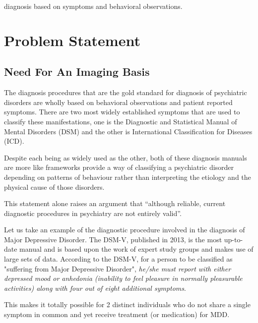 \documentclass{article}
\begin{document}
diagnosis based on symptoms and behavioral observations.

\section{Problem Statement}

\subsection{Need For An Imaging Basis}

The diagnosis procedures that are the gold standard for diagnosis of
psychiatric disorders are wholly based on behavioral observations and
patient reported symptoms. There are two most widely established
symptoms that are used to classify these manifestations, one is the
Diagnostic and Statistical Manual of Mental Disorders (DSM) and the
other is International Classification for Diseases (ICD).

Despite each being as widely used as the other, both of these
diagnosis manuals are more like frameworks provide a way of
classifying a psychiatric disorder depending on patterns of behaviour
rather than interpreting the etiology and the physical cause of those
disorders.

This statement alone raises an argument that ``although reliable,
current diagnostic procedures in psychiatry are not entirely valid''.

\iffalse
Reliable in the sense that any trained professional will arrive at
the same diagnosis for each patient.

Valid in the sense that it reflects the underlying psychological
and biological commonalities and differences among different
disorders to a certain extent. Validity continues to be more
difficult to achieve.
\fi

Let us take an example of the diagnostic procedure involved in the
diagnosis of Major Depressive Disorder. The DSM-V, published in 2013,
is the most up-to-date manual and is based upon the work of expert
study groups and makes use of large sets of data. According to the
DSM-V, for a person to be classified as "suffering from Major
Depressive Disorder", \textit{he/she must report with either depressed
mood or anhedonia (inability to feel pleasure in normally pleasurable
activities) along with four out of eight additional symptoms}.

This makes it totally possible for 2 distinct individuals who do not
share a single symptom in common and yet receive treatment (or
medication) for MDD.
\end{document}
